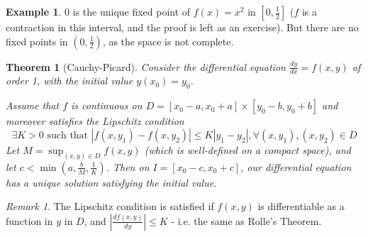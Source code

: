 \documentclass{article}
\theoremstyle{definition}
\newtheorem{exmp}{Example}[section]
\theoremstyle{plain}%
\newtheorem{thm}{Theorem}[section]
\theoremstyle{remark}
\newtheorem*{rem}{Remark}
\newcommand{\cross}{\times}
\begin{document}
\begin{exmp}
    0 is the unique fixed point of $f(x) = x^2$ in $[0, \frac{1}{2}]$ ($f$ is a contraction in this interval, and the proof is left as an exercise). But there are no fixed points in $(0, \frac{1}{2})$, as the space is not complete.
\end{exmp}

\begin{thm}[Cauchy-Picard]
    Consider the differential equation $\frac{dy}{dx} = f(x, y)$ of order 1, with the initial value $y(x_0) = y_0$.
    
    Assume that $f$ is continuous on $D = [x_0 - a, x_0 + a] \cross [y_0 - b, y_0 + b]$ and moreover satisfies the Lipschitz condition
    \[ \exists K > 0 \text{ such that } |f(x, y_1) - f(x, y_2)| \le K|y_1 - y_2|, \forall (x, y_1), (x, y_2) \in D\]
    Let $M = \sup_{(x, y) \in D} f(x, y)$ (which is well-defined on a compact space), and let $c < \min(a, \frac{b}{M}, \frac{1}{K})$. Then on $I = [x_0 - c, x_0 + c]$, our differential equation has a unique solution satisfying the initial value.
\end{thm}

\begin{rem}
   The Lipschitz condition is satisfied if $f(x, y)$ is differentiable as a function in $y$ in $D$, and $\left| \frac{df(x, y)}{dy}\right| \le K$ - i.e. the same as Rolle's Theorem.
\end{rem}
\end{document}

